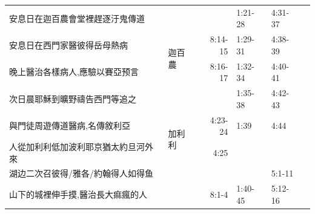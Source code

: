 \begin{table}[H]
\begin{tabular}{p{6.45em}|c|p{4.785em}|r|p{}|p{3.23em}|p{}}
\cmidrule{1-2}\cmidrule{4-7}\multicolumn{2}{p{20.em}|}{安息日在迦百農會堂裡趕逐汙鬼傳道} &\multicolumn{1}{l|}{\multirow{4}{*}{迦百農}}  &  & \multicolumn{1}{p{4.43em}|}{1:21-28} & \multicolumn{1}{p{3.5em}|}{4:31-37} & \multicolumn{1}{r}{} \\ 

\cmidrule{1-2}\cmidrule{4-7}\multicolumn{2}{p{20.em}|}{安息日在西門家醫彼得岳母熱病} && \multicolumn{1}{p{4.145em}|}{8:14-15} & \multicolumn{1}{p{4.43em}|}{1:29-31} & \multicolumn{1}{p{3.5em}|}{4:38-39} & \multicolumn{1}{r}{} \\ 

\cmidrule{1-2}\cmidrule{4-7}\multicolumn{2}{p{20.em}|}{晚上醫治各樣病人,應驗以賽亞预言} && \multicolumn{1}{p{4.145em}|}{8:16-17} & \multicolumn{1}{p{4.43em}|}{1:32-34} & \multicolumn{1}{p{3.5em}|}{4:40-41} &  \\ 


\cmidrule{1-2}\cmidrule{4-7}\multicolumn{2}{p{20.em}|}{次日晨耶穌到曠野禱告西門等追之} && \multicolumn{1}{p{4.145em}|}{} & \multicolumn{1}{p{4.43em}|}{1:35-38} & \multicolumn{1}{p{3.5em}|}{4:42-43} &  \\ \midrule

\multicolumn{2}{p{20.5em}|}{與門徒周遊傳道醫病,名傳敘利亞} &\multicolumn{1}{l|}{\multirow{2}{*}{加利利}} & \multicolumn{1}{p{4.145em}|}{4:23-24} & \multicolumn{1}{p{4.43em}|}{1:39} & \multicolumn{1}{p{3.5em}|}{4:44} & \\ 

\cmidrule{1-2}\cmidrule{4-7}\multicolumn{2}{p{20.em}|}{人從加利利低加波利耶京猶太約旦河外來} &\multicolumn{1}{l|}{\multirow{2}{*}{}} & \multicolumn{1}{p{4.145em}|}{4:25} & \multicolumn{1}{p{4.43em}|}{} & \multicolumn{1}{p{3.5em}|}{} & \\ 

\cmidrule{1-2}\cmidrule{4-7}\multicolumn{2}{p{20.em}|}{湖边二次召彼得/雅各/約翰得人如得鱼} &  & \multicolumn{1}{p{4.145em}|}{} & \multicolumn{1}{p{4.43em}|}{} & \multicolumn{1}{p{3.5em}|}{5:1-11} &\\

\cmidrule{1-2}\cmidrule{4-7}\multicolumn{2}{p{20.5em}|}{山下的城裡伸手摸,醫治長大痲瘋的人} &  & \multicolumn{1}{p{4.145em}|}{8:1-4} & \multicolumn{1}{p{4.43em}|}{1:40-45} & \multicolumn{1}{p{3.5em}|}{5:12-16} & \multicolumn{1}{c}{} \\ \midrule


\end{tabular}
\end{table}
